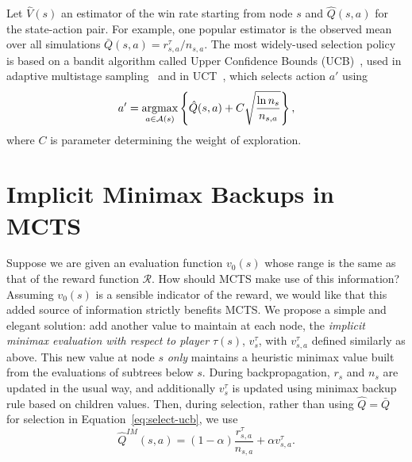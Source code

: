 \documentclass[letterpaper]{article}
\newcommand{\argmax}{\operatornamewithlimits{argmax}}
\newcommand{\bQ}{\bar{Q}}
\newcommand{\cA}{\mathcal{A}}
\newcommand{\cR}{\mathcal{R}}
\newcommand{\hQ}{\hat{Q}}
\newcommand{\hV}{\hat{V}}
\begin{document}
Let $\hV(s)$ an estimator of the win rate starting from node $s$ and $\hQ(s,a)$ for the state-action pair. 
For example, one popular estimator is the observed mean over all simulations 
$\bQ(s,a) = r^{\tau}_{s,a} / n_{s,a}$. 
The most widely-used selection policy is based on a bandit algorithm called Upper Confidence Bounds 
(UCB)~\cite{Auer02Finite}, used in adaptive multistage sampling~\cite{Chang2005AMS} and in 
UCT~\cite{Kocsis06Bandit}, which selects action $a'$ using
\begin{equation}
\label{eq:select-ucb}
a' = \argmax_{a \in \cA(s)} \left\{ \hQ(s,a) + C \sqrt{\frac{\ln n_s}{n_{s,a}}} \right\}, 
\end{equation}
where $C$ is parameter determining the weight of exploration. 

\section{Implicit Minimax Backups in MCTS}

Suppose we are given an evaluation function $v_0(s)$ whose range is the same as that of the reward function $\cR$. 
How should MCTS make use of this information? 
Assuming $v_0(s)$ is a sensible indicator of the reward, we would like that this added source of information
strictly benefits MCTS. 
We propose a simple and elegant solution: add another value to maintain at each node, the 
{\it implicit minimax evaluation with respect to player} $\tau(s)$, $v^{\tau}_s$, with $v^{\tau}_{s,a}$ defined similarly 
as above. 
This new value at node $s$ {\it only} maintains a heuristic minimax value built from the evaluations of subtrees below $s$. 
During backpropagation, $r_s$ and $n_s$ are updated in the usual way, and additionally $v^{\tau}_s$ is updated using minimax backup 
rule based on children values. Then, during selection, rather than using $\hQ = \bQ$ for selection in Equation~\ref{eq:select-ucb}, 
we use
\begin{equation}
\label{eq:imq}
\hQ^{\mathit{IM}}(s,a) = (1-\alpha) \frac{r^{\tau}_{s,a}}{n_{s,a}} + \alpha v^{\tau}_{s,a}.
\end{equation}
\end{document}
